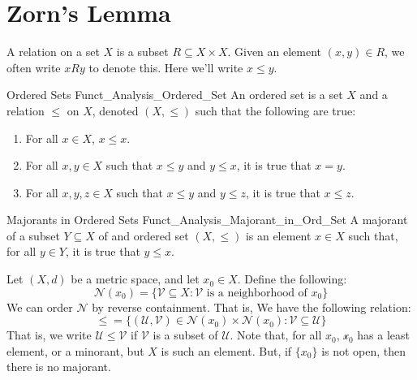 \documentclass[crop=false,class=book,oneside]{standalone}                      %
\begin{document}
    \section{Zorn's Lemma}
        A relation on a set $X$ is a subset
        $R\subseteq{X}\times{X}$. Given an element $(x,y)\in{R}$,
        we often write $xRy$ to denote this. Here we'll write
        $x\leq{y}$.
        \begin{ldefinition}{Ordered Sets}
              {Funct_Analysis_Ordered_Set}
            An ordered set is a set $X$ and a relation
            $\leq$ on $X$, denoted $(X,\leq)$ such that
            the following are true:
            \begin{enumerate}
                \item For all $x\in{X}$, $x\leq{x}$.
                \item For all $x,y\in{X}$ such that $x\leq{y}$ and
                      $y\leq{x}$, it is true that $x=y$.
                \item For all $x,y,z\in{X}$ such that $x\leq{y}$
                      and $y\leq{z}$, it is true that $x\leq{z}$.
            \end{enumerate}
        \end{ldefinition}
        \begin{ldefinition}{Majorants in Ordered Sets}
              {Funct_Analysis_Majorant_in_Ord_Set}
            A majorant of a subset $Y\subseteq{X}$ of
            and ordered set $(X,\leq)$ is an element $x\in{X}$
            such that, for all $y\in{Y}$, it is true that
            $y\leq{x}$.
        \end{ldefinition}
        \begin{lexample}
            Let $(X,d)$ be a metric space, and let
            $x_{0}\in{X}$. Define the following:
            \begin{equation}
                \mathscr{N}(x_{0})=
                \big\{\mathcal{V}\subseteq{X}:\mathcal{V}
                    \textrm{ is a neighborhood of $x_{0}$}\big\}
            \end{equation}
            We can order $\mathscr{N}$ by reverse containment.
            That is, We have the following relation:
            \begin{equation}
                \leq=\big\{(\mathcal{U},\mathcal{V})\in
                    \mathscr{N}(x_{0})\times\mathscr{N}(x_{0})
                    :\mathcal{V}\subseteq\mathcal{U}\big\}
            \end{equation}
            That is, we write $\mathcal{U}\leq\mathcal{V}$ if
            $\mathcal{V}$ is a subset of $\mathcal{U}$. Note
            that, for all $x_{0}$,
            $\mathscr{x_{0}}$ has a least element, or a minorant,
            but $X$ is such an element. But, if $\{x_{0}\}$ is
            not open, then there is no majorant.
        \end{lexample}
\end{document}
